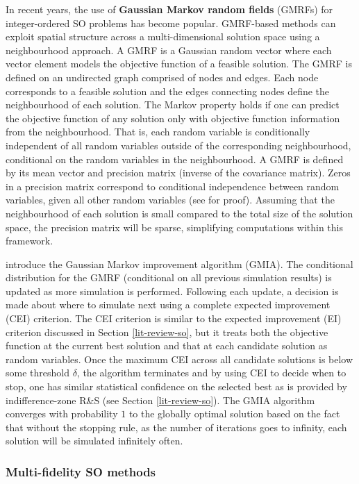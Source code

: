 \documentclass[12pt,a4paper]{article}
\begin{document}
In recent years, the use of \textbf{Gaussian Markov random fields} (GMRFs) \citep{l2019gaussian} for integer-ordered SO problems has become popular. GMRF-based methods can exploit spatial structure across a multi-dimensional solution space using a neighbourhood approach. A GMRF is a Gaussian random vector where each vector element models the objective function of a feasible solution. The GMRF is defined on an undirected graph comprised of nodes and edges. Each node corresponds to a feasible solution and the edges connecting nodes define the neighbourhood of each  solution. The Markov property holds if one can predict the objective function of any solution only with objective function information from the neighbourhood. That is, each random variable is conditionally independent of all random variables outside of the corresponding neighbourhood, conditional on the random variables in the neighbourhood. A GMRF is defined by its mean vector and precision matrix (inverse of the covariance matrix). Zeros in a precision matrix correspond to conditional independence between random variables, given all other random variables (see \cite{rue2005gaussian} for proof). Assuming that the neighbourhood of each solution is small compared to the total size of the solution space, the precision matrix will be sparse, simplifying computations within this framework. 

\citet{l2019gaussian} introduce the Gaussian Markov improvement algorithm (GMIA). The conditional distribution for the GMRF (conditional on all previous simulation results) is updated as more simulation is performed. Following each update, a decision is made about where to simulate next using a complete expected improvement (CEI) criterion. The CEI criterion is similar to the expected improvement (EI) criterion discussed in Section \ref{lit-review-so}, but it treats both the objective function at the current best solution and that at each candidate solution as random variables. Once the maximum CEI across all candidate solutions is below some threshold $\delta$, the algorithm terminates and by using CEI to decide when to stop, one has similar statistical confidence on the selected best as is provided by indifference-zone R\&S (see Section \ref{lit-review-so}). The GMIA algorithm converges with probability $1$ to the globally optimal solution based on the fact that without the stopping rule, as the number of iterations goes to infinity, each solution will be simulated infinitely often.

\subsubsection{Multi-fidelity SO methods}\label{mfso-methods}
\end{document}
